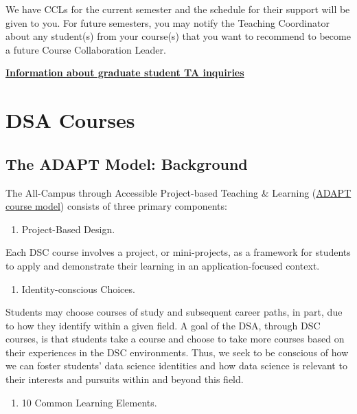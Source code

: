 \documentclass[
]{book}
\providecommand{\tightlist}{%
  \setlength{\itemsep}{0pt}\setlength{\parskip}{0pt}}
\begin{document}
We have CCLs for the current semester and the schedule for their support will be given to you. For future semesters, you may notify the Teaching Coordinator about any student(s) from your course(s) that you want to recommend to become a future Course Collaboration Leader.

\href{https://docs.google.com/document/d/1VPfx_Ib2ToiO3eP1ipACCrsnoFTWcJNVhCXyESGf5PY/edit?usp=sharing}{\textbf{Information about graduate student TA inquiries}}

\chapter{DSA Courses}\label{dsa-courses}

\section{The ADAPT Model: Background}\label{the-adapt-model-background}

The All-Campus through Accessible Project-based Teaching \& Learning (\href{https://datascienceacademy.ncsu.edu/courses/course-model/}{ADAPT course model}) consists of three primary components:

\begin{enumerate}
\def\labelenumi{\arabic{enumi})}
\tightlist
\item
  Project-Based Design.
\end{enumerate}

Each DSC course involves a project, or mini-projects, as a framework for students to apply and demonstrate their learning in an application-focused context.

\begin{enumerate}
\def\labelenumi{\arabic{enumi})}
\setcounter{enumi}{1}
\tightlist
\item
  Identity-conscious Choices.
\end{enumerate}

Students may choose courses of study and subsequent career paths, in part, due to how they identify within a given field. A goal of the DSA, through DSC courses, is that students take a course and choose to take more courses based on their experiences in the DSC environments. Thus, we seek to be conscious of how we can foster students' data science identities and how data science is relevant to their interests and pursuits within and beyond this field.

\begin{enumerate}
\def\labelenumi{\arabic{enumi})}
\setcounter{enumi}{2}
\tightlist
\item
  10 Common Learning Elements.
\end{enumerate}
\end{document}
